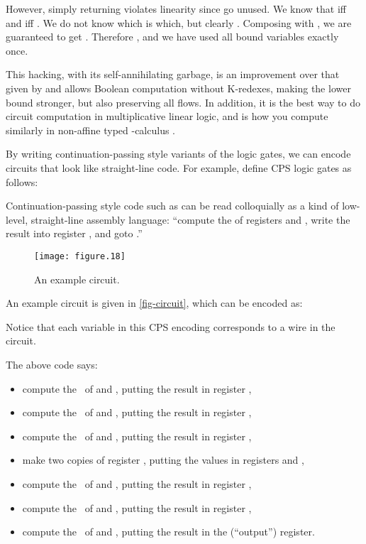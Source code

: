 However, simply returning  violates linearity since
 go unused.  We know that  iff  and
 iff .  We do not know which is which, but
clearly .  Composing  with , we are guaranteed to get .  Therefore , and we have used all bound
variables exactly once.

This hacking, with its self-annihilating garbage, is an improvement
over that given by \citet{mairson-jfp04} and allows Boolean computation
without K-redexes, making the lower bound stronger, but also
preserving all flows.  In addition, it is the best way to do circuit
computation in multiplicative linear logic, and is how you compute
similarly in non-affine typed -calculus \cite{mairson-geocal06}.

By writing continuation-passing style variants of the logic gates, we
can encode circuits that look like straight-line code.  For example,
define CPS logic gates as follows:


Continuation-passing style code such as  can be read colloquially as a kind of low-level, straight-line
assembly language: ``compute the  of registers  and ,
write the result into register , and goto .''

\begin{figure} 
  \centering 
  \texttt{[image: figure.18]}
  \caption{An example circuit.}
  \label{fig-circuit}
\end{figure}

An example circuit is given in \autoref{fig-circuit}, which can be
encoded as:

Notice that each variable in this CPS encoding corresponds to a wire
in the circuit.

The above code says:
\begin{itemize} 
\item compute the \AND\ of  and , putting the result in
  register ,
\item compute the \AND\ of  and , putting the result in
  register ,
\item compute the \AND\ of  and , putting the result in
  register ,
\item make two copies of register , putting the values in registers
   and ,
\item compute the \Or\ of  and , putting the result in
  register ,
\item compute the \Or\ of  and , putting the result in
  register ,
\item compute the \Or\ of  and , putting the result in
  the  (``output'') register.
\end{itemize}

